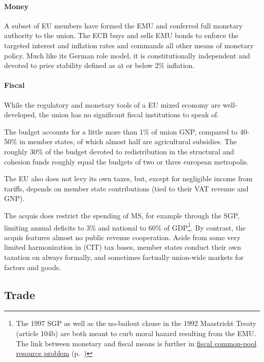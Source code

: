 \paragraph{Money} A subset of \gls{EU} members have formed the \gls{EMU} and conferred full monetary authority to the union.
The \gls{ECB} buys and sells \gls{EMU} bonds to enforce the targeted interest and inflation rates and commands all other means of monetary policy.
Much like its German role model, it is constitutionally independent and devoted to price stability defined as at or below 2\% inflation.

\paragraph{Fiscal} While the regulatory and monetary tools of a \gls{EU} mixed economy are well-developed, the union has no significant fiscal institutions to speak of.


The budget accounts for a little more than 1\% of union \gls{GNP}, compared to 40-50\% in member states, of which almost half are agricultural subsidies.
The roughly 30\% of the budget devoted to redistribution in the structural and cohesion funds roughly equal the budgets of two or three european metropolis.

The \gls{EU} also does not levy its own taxes, but, except for negligible income from tariffs, depends on member state contributions (tied to their \gls{VAT} revenue and \gls{GNP}).

The acquis does restrict the spending of \gls{MS}, for example through the \gls{SGP}, limiting annual deficits to 3\% and national to 60\% of \gls{GDP}\footnote{
	The 1997 \gls{SGP} as well as the no-bailout clause in the 1992 Maastricht Treaty (article 104b) are both meant to curb moral hazard resulting from the \gls{EMU}.
The link between monetary and fiscal means is further in \hyperref[sec:fiscal-CPR]{fiscal common-pool resource problem} (p.~\pageref{sec:fiscal-CPR})}.%
By contrast, the acquis features almost no public revenue cooperation.
Aside from some very limited harmonization in (\gls{CIT}) tax bases, member states conduct their own taxation on always formally, and sometimes factually union-wide markets for factors and goods.

\subsection[Trade]{Trade}

